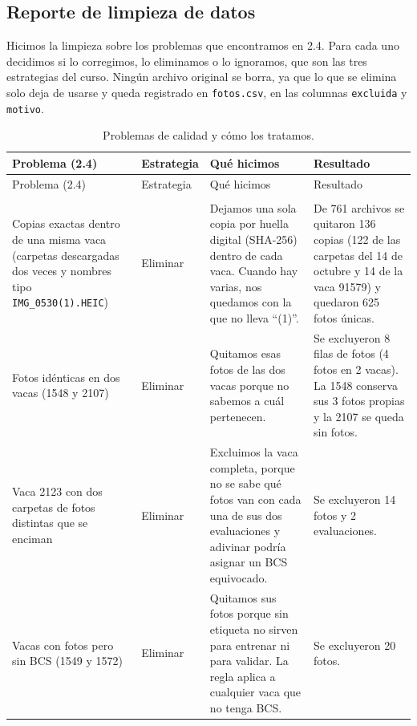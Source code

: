 \subsection{Reporte de limpieza de datos}

Hicimos la limpieza sobre los problemas que encontramos en 2.4. Para cada uno decidimos si lo corregimos, lo eliminamos o lo ignoramos, que son las tres estrategias del curso. Ningún archivo original se borra, ya que lo que se elimina solo deja de usarse y queda registrado en \nolinkurl{fotos.csv}, en las columnas \texttt{excluida} y \texttt{motivo}.

\begingroup
\small
\begin{xltabular}{\textwidth}{>{\raggedright\arraybackslash}p{0.22\textwidth}>{\raggedright\arraybackslash}p{0.11\textwidth}>{\raggedright\arraybackslash}X>{\raggedright\arraybackslash}p{0.25\textwidth}}
  \caption{Problemas de calidad y cómo los tratamos.}\label{tab:limpieza}\\
    \toprule
    Problema (2.4) & Estrategia & Qué hicimos & Resultado \\
    \midrule
  \endfirsthead
    \toprule
    Problema (2.4) & Estrategia & Qué hicimos & Resultado \\
    \midrule
  \endhead
    \midrule
     \\
  \endfoot
    \bottomrule
  \endlastfoot
    Copias exactas dentro de una misma vaca (carpetas descargadas dos veces y nombres tipo \nolinkurl{IMG_0530(1).HEIC}) & Eliminar & Dejamos una sola copia por huella digital (SHA-256) dentro de cada vaca. Cuando hay varias, nos quedamos con la que no lleva ``(1)''. & De 761 archivos se quitaron 136 copias (122 de las carpetas del 14 de octubre y 14 de la vaca 91579) y quedaron 625 fotos únicas. \\
    \addlinespace
    Fotos idénticas en dos vacas (1548 y 2107) & Eliminar & Quitamos esas fotos de las dos vacas porque no sabemos a cuál pertenecen. & Se excluyeron 8 filas de fotos (4 fotos en 2 vacas). La 1548 conserva sus 3 fotos propias y la 2107 se queda sin fotos. \\
    \addlinespace
    Vaca 2123 con dos carpetas de fotos distintas que se enciman & Eliminar & Excluimos la vaca completa, porque no se sabe qué fotos van con cada una de sus dos evaluaciones y adivinar podría asignar un BCS equivocado. & Se excluyeron 14 fotos y 2 evaluaciones. \\
    \addlinespace
    Vacas con fotos pero sin BCS (1549 y 1572) & Eliminar & Quitamos sus fotos porque sin etiqueta no sirven para entrenar ni para validar. La regla aplica a cualquier vaca que no tenga BCS. & Se excluyeron 20 fotos. \\

\end{xltabular}
